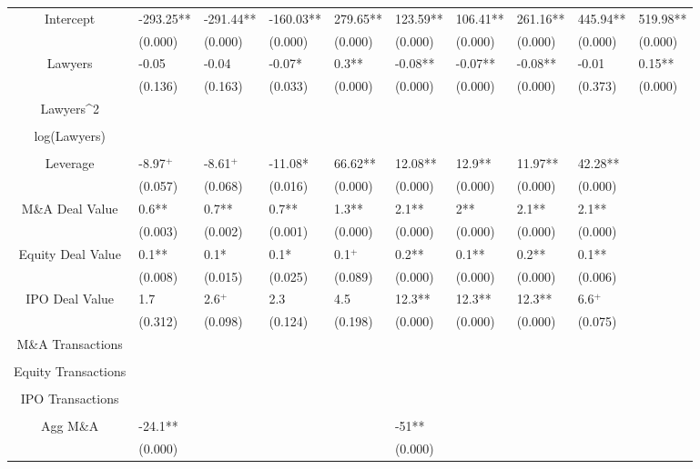 \documentclass{article}
\begin{document}
\begin{table}[H]
\begin{tabular}{|clllllllll|}
Intercept & -293.25** & -291.44** & -160.03** & 279.65** & 123.59** & 106.41** & 261.16** & 445.94** & 519.98** \\ 
   & (0.000) & (0.000) & (0.000) & (0.000) & (0.000) & (0.000) & (0.000) & (0.000) & (0.000) \\ 
  Lawyers & -0.05 & -0.04 & -0.07* & 0.3** & -0.08** & -0.07** & -0.08** & -0.01 & 0.15** \\ 
   & (0.136) & (0.163) & (0.033) & (0.000) & (0.000) & (0.000) & (0.000) & (0.373) & (0.000) \\ 
  Lawyers^2 &  &  &  &  &  &  &  &  &  \\ 
   &  &  &  &  &  &  &  &  &  \\ 
  log(Lawyers) &  &  &  &  &  &  &  &  &  \\ 
   &  &  &  &  &  &  &  &  &  \\ 
  Leverage & -8.97$^{+}$ & -8.61$^{+}$ & -11.08* & 66.62** & 12.08** & 12.9** & 11.97** & 42.28** &  \\ 
   & (0.057) & (0.068) & (0.016) & (0.000) & (0.000) & (0.000) & (0.000) & (0.000) &  \\ 
  M\&A Deal Value & 0.6** & 0.7** & 0.7** & 1.3** & 2.1** & 2** & 2.1** & 2.1** &  \\ 
   & (0.003) & (0.002) & (0.001) & (0.000) & (0.000) & (0.000) & (0.000) & (0.000) &  \\ 
  Equity Deal Value & 0.1** & 0.1* & 0.1* & 0.1$^{+}$ & 0.2** & 0.1** & 0.2** & 0.1** &  \\ 
   & (0.008) & (0.015) & (0.025) & (0.089) & (0.000) & (0.000) & (0.000) & (0.006) &  \\ 
  IPO Deal Value & 1.7 & 2.6$^{+}$ & 2.3 & 4.5 & 12.3** & 12.3** & 12.3** & 6.6$^{+}$ &  \\ 
   & (0.312) & (0.098) & (0.124) & (0.198) & (0.000) & (0.000) & (0.000) & (0.075) &  \\ 
  M\&A Transactions &  &  &  &  &  &  &  &  &  \\ 
   &  &  &  &  &  &  &  &  &  \\ 
  Equity Transactions &  &  &  &  &  &  &  &  &  \\ 
   &  &  &  &  &  &  &  &  &  \\ 
  IPO Transactions &  &  &  &  &  &  &  &  &  \\ 
   &  &  &  &  &  &  &  &  &  \\ 
  Agg M\&A & -24.1** &  &  &  & -51** &  &  &  &  \\ 
   & (0.000) &  &  &  & (0.000) &  &  &  &  \\ 

\end{tabular}
\end{table}
\end{document}
